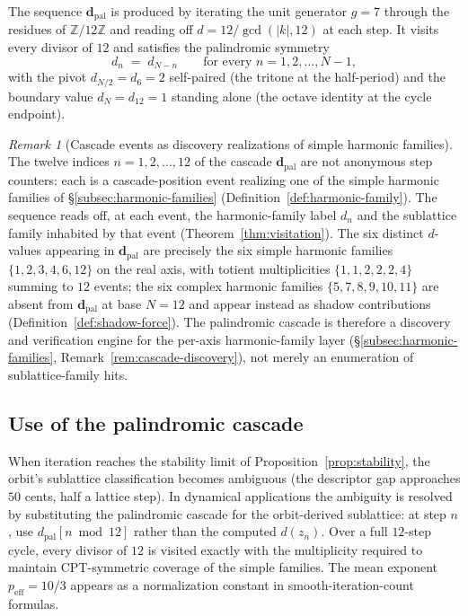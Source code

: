 \documentclass[11pt,a4paper]{article}
\theoremstyle{definition}
\theoremstyle{remark}
\newtheorem{remark}[theorem]{Remark}
\newcommand{\Z}{\mathbb{Z}}
\begin{document}
The sequence $\mathbf{d}_{\mathrm{pal}}$ is produced by iterating the unit generator $g=7$ through the residues of $\Z/12\Z$ and reading off $d = 12/\gcd(|k|,12)$ at each step. It visits every divisor of $12$ and satisfies the palindromic symmetry
\begin{equation}\label{eq:palindrome}
d_{n} \;=\; d_{N-n} \qquad\text{for every } n = 1,2,\ldots,N-1,
\end{equation}
with the pivot $d_{N/2}=d_{6}=2$ self-paired (the tritone at the half-period) and the boundary value $d_{N}=d_{12}=1$ standing alone (the octave identity at the cycle endpoint).

\begin{remark}[Cascade events as discovery realizations of simple harmonic families]\label{rem:events-as-realizations}
The twelve indices $n=1,2,\ldots,12$ of the cascade $\mathbf{d}_{\mathrm{pal}}$ are not anonymous step counters: each is a cascade-position event realizing one of the simple harmonic families of \S\ref{subsec:harmonic-families} (Definition~\ref{def:harmonic-family}). The sequence reads off, at each event, the harmonic-family label $d_{n}$ and the sublattice family inhabited by that event (Theorem~\ref{thm:visitation}). The six distinct $d$-values appearing in $\mathbf{d}_{\mathrm{pal}}$ are precisely the six simple harmonic families $\{1,2,3,4,6,12\}$ on the real axis, with totient multiplicities $\{1,1,2,2,2,4\}$ summing to $12$ events; the six complex harmonic families $\{5,7,8,9,10,11\}$ are absent from $\mathbf{d}_{\mathrm{pal}}$ at base $N=12$ and appear instead as shadow contributions (Definition~\ref{def:shadow-force}). The palindromic cascade is therefore a discovery and verification engine for the per-axis harmonic-family layer (\S\ref{subsec:harmonic-families}, Remark~\ref{rem:cascade-discovery}), not merely an enumeration of sublattice-family hits.
\end{remark}

\subsection{Use of the palindromic cascade}

When iteration reaches the stability limit of Proposition~\ref{prop:stability}, the orbit's sublattice classification becomes ambiguous (the descriptor gap approaches $50$ cents, half a lattice step). In dynamical applications the ambiguity is resolved by substituting the palindromic cascade for the orbit-derived sublattice: at step $n$, use $d_{\mathrm{pal}}[n\bmod 12]$ rather than the computed $d(z_{n})$. Over a full $12$-step cycle, every divisor of $12$ is visited exactly with the multiplicity required to maintain CPT-symmetric coverage of the simple families. The mean exponent $p_{\mathrm{eff}}=10/3$ appears as a normalization constant in smooth-iteration-count formulas.
\end{document}

